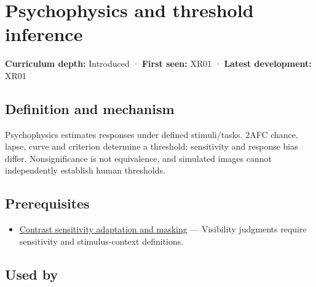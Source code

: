 \hypertarget{appendix-1759f03e8ce7}{}\label{referencestart:appendix-1759f03e8ce7}
\section{Psychophysics and threshold inference}\label{appendix-1759f03e8ce7-psychophysics-and-threshold-inference}

\hypertarget{appendix-1759f03e8ce7-psychophysics-and-threshold-inference}{}

\textbf{Curriculum depth:} Introduced · \textbf{First seen:} XR01 · \textbf{Latest development:} XR01

\begin{allmightroledefinition}

\subsection{Definition and mechanism}\label{appendix-1759f03e8ce7-definition-and-mechanism}

\hypertarget{appendix-1759f03e8ce7-definition-and-mechanism}{}

Psychophysics estimates responses under defined stimuli/tasks. 2AFC chance, lapse, curve and criterion determine a threshold; sensitivity and response bias differ. Nonsignificance is not equivalence, and simulated images cannot independently establish human thresholds.

\end{allmightroledefinition}

\subsection{Prerequisites}\label{appendix-1759f03e8ce7-prerequisites}

\hypertarget{appendix-1759f03e8ce7-prerequisites}{}

\begin{itemize}
\tightlist
\item
  \hyperref[appendix-b3aa9e8e01ad]{Contrast sensitivity adaptation and masking} --- Visibility judgments require sensitivity and stimulus-context definitions.
\end{itemize}

\subsection{Used by}\label{appendix-1759f03e8ce7-used-by}

\hypertarget{appendix-1759f03e8ce7-used-by}{}

